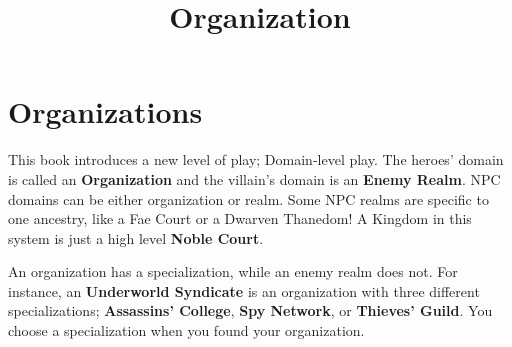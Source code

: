\documentclass[letterpaper,twocolumn,openany,nodeprecatedcode]{dndbook}
\title{Organization}
\author{}
\date{}
\begin{document}




\footnotesize

\begingroup
\DndSetThemeColor[PhbMauve]

\section{Organizations}


This book introduces a new level of play; Domain-level play.
The heroes’ domain is called an \textbf{Organization} and the villain’s domain is an \textbf{Enemy Realm}.
NPC domains can be either organization or realm.
Some NPC realms are specific to one ancestry, like a Fae Court or a Dwarven Thanedom!
A Kingdom in this system is just a high level \textbf{Noble Court}. %

An organization has a specialization, while an enemy realm does not.
For instance, an \textbf{Underworld Syndicate} is an organization with three different specializations; \textbf{Assassins’ College}, \textbf{Spy Network}, or \textbf{Thieves’ Guild}.
You choose a specialization when you found your organization.


\end{document}
